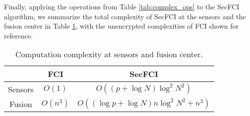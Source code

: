 \documentclass[letterpaper, 10 pt, journal, twoside]{ieeetran}  %
\providecommand{\DIFadd}[1]{{\protect\color{blue}\uwave{#1}}} %
\providecommand{\DIFdel}[1]{{\protect\color{red}\sout{#1}}}                      %
\providecommand{\DIFaddFL}[1]{\DIFadd{#1}} %
\providecommand{\DIFdelFL}[1]{\DIFdel{#1}} %
\providecommand{\DIFaddbeginFL}{} %
\providecommand{\DIFaddendFL}{} %
\providecommand{\DIFdelbeginFL}{} %
\providecommand{\DIFdelendFL}{} %
\begin{document}
Finally, applying the operations from Table \ref{tab:complex_ops} to the SecFCI algorithm, we summarize the total complexity of SecFCI at the sensors and the fusion center in Table \ref{tab:complex}, with the unencrypted complexities of FCI shown for reference. 
\begin{table}[tb]
   \centering
   \caption{Computation complexity at sensors and fusion center.}
   \label{tab:complex}
   \begin{tabular}{ |c|c|c| }
      \hline
       & \textbf{FCI} & \textbf{SecFCI} \\ 
      \hline
      Sensors & $O(1)$ & \DIFdelbeginFL \DIFdelFL{$O\left((p + \log{N})\log^2{N^2}\right)$ }\DIFdelendFL \DIFaddbeginFL \DIFaddFL{$O\left(p\log^2{N} + \log^3{N}\right)$ }\DIFaddendFL \\ 
      Fusion & $O(n^3)$ & \DIFdelbeginFL \DIFdelFL{$O\left((\log{p} + \log{N})n\log^2{N^2} + n^3\right)$ }\DIFdelendFL \DIFaddbeginFL \DIFaddFL{$O\left(n\log{p}\log^2{N} + n\log^3{N} + n^3\right)$ }\DIFaddendFL \\ 
      \hline
   \end{tabular}
\end{table}

\end{document}

